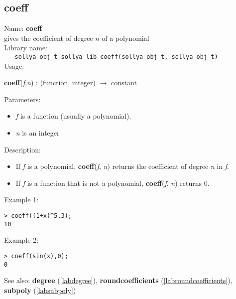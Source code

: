 \subsection{coeff}
\label{labcoeff}
\noindent Name: \textbf{coeff}\\
\phantom{aaa}gives the coefficient of degree $n$ of a polynomial\\[0.2cm]
\noindent Library name:\\
\verb|   sollya_obj_t sollya_lib_coeff(sollya_obj_t, sollya_obj_t)|\\[0.2cm]
\noindent Usage: 
\begin{center}
\textbf{coeff}(\emph{f},\emph{n}) : (\textsf{function}, \textsf{integer}) $\rightarrow$ \textsf{constant}\\
\end{center}
Parameters: 
\begin{itemize}
\item \emph{f} is a function (usually a polynomial).
\item \emph{n} is an integer
\end{itemize}
\noindent Description: \begin{itemize}

\item If \emph{f} is a polynomial, \textbf{coeff}(\emph{f}, \emph{n}) returns the coefficient of
   degree \emph{n} in \emph{f}.

\item If \emph{f} is a function that is not a polynomial, \textbf{coeff}(\emph{f}, \emph{n}) returns 0.
\end{itemize}
\noindent Example 1: 
\begin{center}\begin{minipage}{15cm}\begin{Verbatim}[frame=single]
> coeff((1+x)^5,3);
10
\end{Verbatim}
\end{minipage}\end{center}
\noindent Example 2: 
\begin{center}\begin{minipage}{15cm}\begin{Verbatim}[frame=single]
> coeff(sin(x),0);
0
\end{Verbatim}
\end{minipage}\end{center}
See also: \textbf{degree} (\ref{labdegree}), \textbf{roundcoefficients} (\ref{labroundcoefficients}), \textbf{subpoly} (\ref{labsubpoly})
